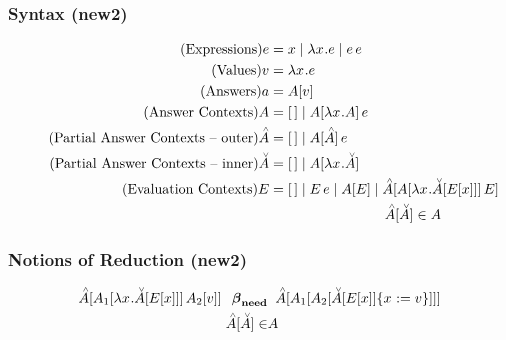 \subsubsection*{Syntax (new2)}
\begin{align*}
  \tag{Expressions}
  \e   &= x \mid \lxe \mid \ap{\e}{\e} \\
  \tag{Values}
  \val &= \lxe \\
  \tag{Answers}
  \ans &= \Av \\
  \tag{Answer Contexts}
  \A   &= \hole \mid \ap{\inA{\lx{\A}}}{\e} \\
  \tag{Partial Answer Contexts -- outer}
  \Ap &= \hole \mid \ap{\inA{\Ap}}{\e} \\
  \tag{Partial Answer Contexts -- inner}
  \Am &= \hole \mid \inA{\lx\Am} \\
  \tag{Evaluation Contexts} 
  \E   &= \hole \mid \ap{\E}{\e} \mid \inA{\E}
          \mid \inAp{\ap{\inA{\lx\inAm{\inE{x}}}}{\E}} \\
& \hspace{2.9cm} \inAp{\Am} \in \A
\end{align*}


\subsubsection*{Notions of Reduction (new2)}
\begin{align*}
\inAp{\ap{\inA[_1]{\lx\inAm{\Ex}}}{\Av[_2]}}
\;\;\betaneednr&\;\;
\inAp{\inA[_1]{\inA[_2]{\substx{\inAm{\Ex}}{\val}}}} \\
\inAp{\Am} \in& \A 
\end{align*}
